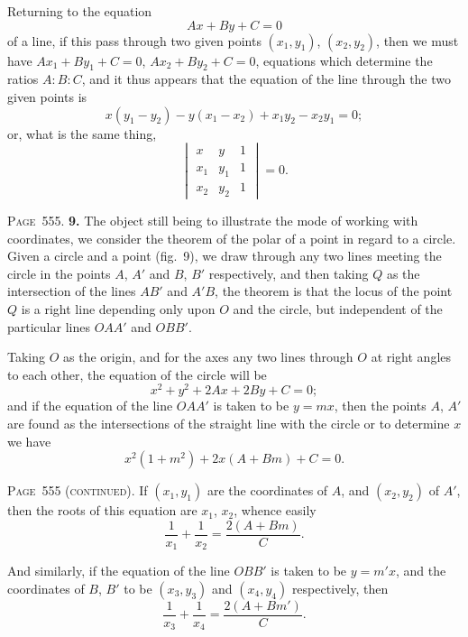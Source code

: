 \documentclass[11pt,a4paper]{article}
\theoremstyle{definition}
\begin{document}
Returning to the equation
\[
Ax+By+C=0
\]
of a line, if this pass through two given points $(x_1,y_1)$, $(x_2,y_2)$, then we must have $Ax_1+By_1+C=0$, $Ax_2+By_2+C=0$, equations which determine the ratios $A:B:C$, and it thus appears that the equation of the line through the two given points is
\[
x(y_1-y_2) - y(x_1-x_2) + x_1y_2 - x_2y_1 = 0;
\]
or, what is the same thing,
\[
\begin{vmatrix}
x & y & 1 \\
x_1 & y_1 & 1 \\
x_2 & y_2 & 1
\end{vmatrix} = 0.
\]

\newpage
\noindent\textsc{Page~555.} \textbf{9.} The object still being to illustrate the mode of working with coordinates, we consider the theorem of the polar of a point in regard to a circle. Given a circle and a point (fig.~9), we draw through any two lines meeting the circle in the points $A$, $A'$ and $B$, $B'$ respectively, and then taking $Q$ as the intersection of the lines $AB'$ and $A'B$, the theorem is that the locus of the point $Q$ is a right line depending only upon $O$ and the circle, but independent of the particular lines $OAA'$ and $OBB'$.

Taking $O$ as the origin, and for the axes any two lines through $O$ at right angles to each other, the equation of the circle will be
\[
x^2 + y^2 + 2Ax + 2By + C = 0;
\]
and if the equation of the line $OAA'$ is taken to be $y=mx$, then the points $A$, $A'$ are found as the intersections of the straight line with the circle or to determine $x$ we have
\[
x^2(1+m^2) + 2x(A+Bm) + C = 0.
\]

\noindent\textsc{Page~555 (continued).} If $(x_1,y_1)$ are the coordinates of $A$, and $(x_2,y_2)$ of $A'$, then the roots of this equation are $x_1$, $x_2$, whence easily
\[
\frac{1}{x_1} + \frac{1}{x_2} = \frac{2(A+Bm)}{C}.
\]

And similarly, if the equation of the line $OBB'$ is taken to be $y=m'x$, and the coordinates of $B$, $B'$ to be $(x_3,y_3)$ and $(x_4,y_4)$ respectively, then
\[
\frac{1}{x_3} + \frac{1}{x_4} = \frac{2(A+Bm')}{C}.
\]
\end{document}

